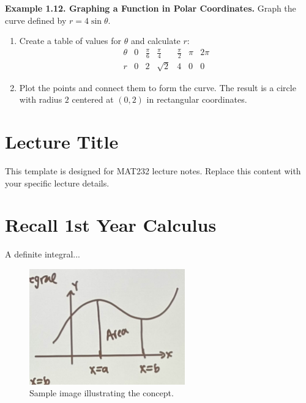 \documentclass{article}
\begin{document}
\begin{examplebox}
\textbf{Example 1.12. Graphing a Function in Polar Coordinates.}
Graph the curve defined by $r = 4\sin\theta$.  
\begin{enumerate}
    \item Create a table of values for $\theta$ and calculate $r$:
    \[
    \begin{array}{c|c|c|c|c|c|c}
    \theta & 0 & \frac{\pi}{6} & \frac{\pi}{4} & \frac{\pi}{2} & \pi & 2\pi \\
    \hline
    r & 0 & 2 & \sqrt{2} & 4 & 0 & 0
    \end{array}
    \]
    \item Plot the points and connect them to form the curve. The result is a circle with radius $2$ centered at $(0, 2)$ in rectangular coordinates.
\end{enumerate}
\end{examplebox}


\normalsize

\section*{Lecture Title}
\begin{notebox}
This template is designed for MAT232 lecture notes. Replace this content with your specific lecture details.
\end{notebox}

\section*{Recall 1st Year Calculus}
\begin{definitionbox}
A definite integral...
\end{definitionbox}
\begin{figure}[H]
    \centering
    \includegraphics[width=0.6\textwidth]{1styearcalc.jpg}
    \caption{Sample image illustrating the concept.}
    \label{fig:sample_image}
\end{figure}
\end{document}
